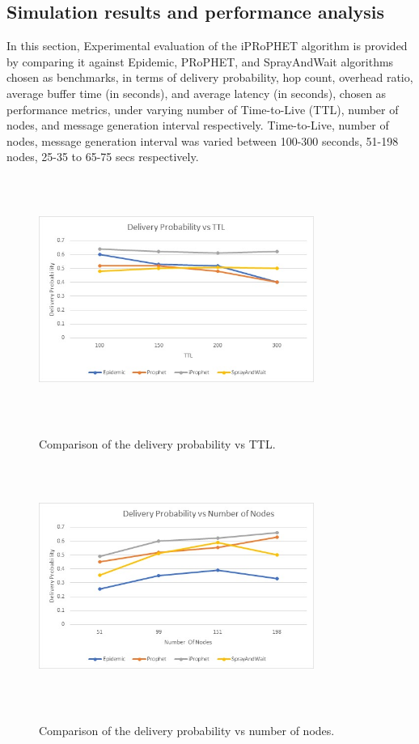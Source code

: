 \documentclass[10pt,journal]{IEEEtran}
\begin{document}
\subsection{Simulation results and performance analysis}
In this section, Experimental evaluation of the iPRoPHET algorithm is provided by comparing it against Epidemic, PRoPHET, and SprayAndWait algorithms chosen as benchmarks, in terms of delivery probability, hop count, overhead ratio, average buffer time (in seconds), and average latency (in seconds), chosen as performance metrics, under varying number of Time-to-Live (TTL), number of nodes, and message generation interval respectively. Time-to-Live, number of nodes, message generation interval was varied between 100-300 seconds, 51-198 nodes, 25-35 to 65-75 secs respectively.


\begin{figure}[H]
\centering
\includegraphics[width=9cm, height=8cm]{del_prob_vs_ttl.png}\\
\caption{Comparison of the delivery probability vs TTL.}
\label{one}
\end{figure}

\begin{figure}[H]
	\centering
	\includegraphics[width=9cm, height=8cm]{del_prob_vs_num_of_nodes.png}\\
	\caption{Comparison of the delivery probability vs number of nodes.}
	\label{four}
\end{figure}
\end{document}
